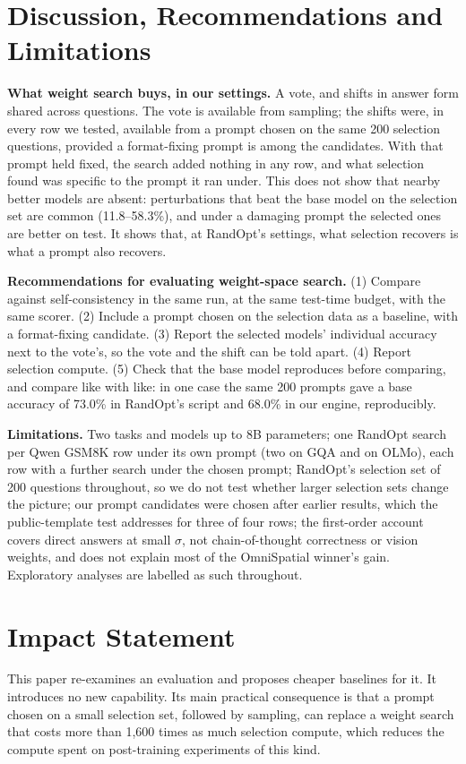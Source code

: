 \documentclass{article}
\begin{document}
\section{Discussion, Recommendations and Limitations}\label{sec:discussion}
\textbf{What weight search buys, in our settings.} A vote, and shifts in answer form shared across questions. The vote
is available from sampling; the shifts were, in every row we tested, available from a prompt chosen on the same 200
selection questions, provided a format-fixing prompt is among the candidates. With that prompt held fixed, the search
added nothing in any row, and what selection found was specific to the prompt it ran under. This does not show that
nearby better models are absent: perturbations that beat the base model on the selection set are common (11.8--58.3\%),
and under a damaging prompt the selected ones are better on test. It shows that, at RandOpt's settings, what selection
recovers is what a prompt also recovers.

\textbf{Recommendations for evaluating weight-space search.} (1) Compare against self-consistency in the same run, at
the same test-time budget, with the same scorer. (2) Include a prompt chosen on the selection data as a baseline, with a
format-fixing candidate. (3) Report the selected models' individual accuracy next to the vote's, so the vote and the
shift can be told apart. (4) Report selection compute. (5) Check that the base model reproduces before comparing, and
compare like with like: in one case the same 200 prompts gave a base accuracy of 73.0\% in RandOpt's script and 68.0\%
in our engine, reproducibly.

\textbf{Limitations.} Two tasks and models up to 8B parameters; one RandOpt search per Qwen GSM8K row under its own
prompt (two on GQA and on OLMo), each row with a further search under the chosen prompt; RandOpt's selection set of 200
questions throughout, so we do not test whether larger selection sets change the picture; our prompt candidates were
chosen after earlier results, which the public-template test addresses for three of four rows; the first-order account
covers direct answers at small $\sigma$, not chain-of-thought correctness or vision weights, and does not explain most
of the OmniSpatial winner's gain. Exploratory analyses are labelled as such throughout.

\section*{Impact Statement}
This paper re-examines an evaluation and proposes cheaper baselines for it. It introduces no new capability. Its
main practical consequence is that a prompt chosen on a small selection set, followed by sampling, can replace a
weight search that costs more than 1,600 times as much selection compute, which reduces the compute spent on
post-training experiments of this kind.
\end{document}
